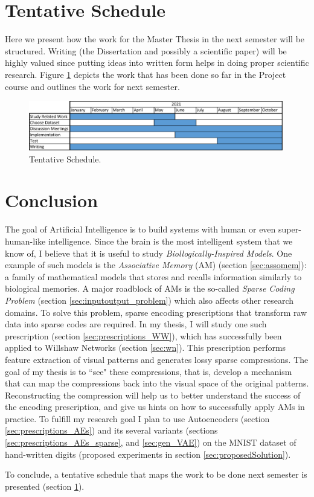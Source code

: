 \documentclass[runningheads]{llncs}
\begin{document}
\section{Tentative Schedule}
\label{sec:schedule}
Here we present how the work for the Master Thesis in the next semester will be structured.
Writing (the Dissertation and possibly a scientific paper) will be highly valued since putting ideas into written form helps in doing proper scientific research. Figure \ref{fig:schedule} depicts the work that has been done so far in the Project course and outlines the work for next semester.  
\begin{figure}[h]
    \centering
    \includegraphics[width=0.99\textwidth]{introduction/img/schedule.png}
    \caption{Tentative Schedule.}
    \label{fig:schedule}
\end{figure}

\section{Conclusion}
\label{sec:conclusion}
The goal of Artificial Intelligence is to build systems with human or even super-human-like intelligence. Since the brain is the most intelligent system that we know of, I believe that it is useful to study \textit{Biollogically-Inspired Models}. One example of such models is the \textit{Associative Memory} (AM) (section \ref{sec:assomem}): a family of mathematical models that stores and recalls information similarly to biological memories. A major roadblock of AMs is the so-called \textit{Sparse Coding Problem} (section \ref{sec:inputoutput_problem}) which also affects other research domains. To solve this problem, sparse encoding prescriptions that transform raw data into sparse codes are required.
In my thesis, I will study one such prescription (section \ref{sec:prescriptions_WW}), which has successfully been applied to Willshaw Networks (section \ref{sec:wn}). This prescription performs feature extraction of visual patterns and generates lossy sparse compressions. The goal of my thesis is to ``see" these compressions, that is, develop a mechanism that can map the compressions back into the visual space of the original patterns. Reconstructing the compression will help us to better understand the success of the encoding prescription, and give us hints on how to successfully apply AMs in practice.
To fulfill my research goal I plan to use Autoencoders (section \ref{sec:prescriptions_AEs}) and its several variants (sections \ref{sec:prescriptions_AEs_sparse}, and \ref{sec:gen_VAE}) on the MNIST dataset of hand-written digits (proposed experiments in section \ref{sec:proposedSolution}).

To conclude, a tentative schedule that maps the work to be done next semester is presented (section \ref{sec:schedule}).




\end{document}
